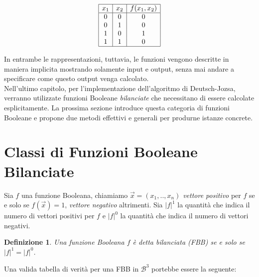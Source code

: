 \documentclass[12pt,a4paper,openright]{report}
\newtheorem{mydef}{Definizione}[chapter]
\begin{document}
\begin{displaymath}
    \begin{array}{|c|c|c|}\hline
        x_1 & x_2 & f(x_1, x_2) \\\hline 
        0   & 0   &  0  \\ 
        0   & 1   &  0  \\
        1   & 0   &  1  \\
        1   & 1   &  0  \\\hline
    \end{array}
\end{displaymath}

In entrambe le rappresentazioni, tuttavia, le funzioni vengono descritte in maniera implicita mostrando solamente input e output,
senza mai andare a specificare come questo output venga calcolato.\\
Nell'ultimo capitolo, per l'implementazione dell'algoritmo di Deutsch-Jozsa, verranno utilizzate funzioni Booleane \textit{bilanciate}
che necessitano di essere calcolate esplicitamente. La prossima sezione introduce questa categoria di funzioni Booleane e 
propone due metodi effettivi e generali per produrne istanze concrete.

\section{Classi di Funzioni Booleane Bilanciate}

Sia $f$ una funzione Booleana, chiamiamo $\vec{x}=(x_1,..,x_n)$ \textit{vettore positivo} per $f$ se e solo se
$f(\vec{x}) = 1$, \textit{vettore negativo} altrimenti. Sia ${\left\vert{f}\right\vert}^1$ la quantità che indica il numero di vettori
positivi per $f$ e ${\left\vert{f}\right\vert}^0$ la quantità che indica il numero di vettori negativi.
\begin{mydef}
    Una funzione Booleana $f$ è detta bilanciata (FBB) se e solo se ${\left\vert{f}\right\vert}^1 = {\left\vert{f}\right\vert}^0$.
\end{mydef}

\noindent Una valida tabella di verità per una FBB in $\mathcal{B}^3$ portebbe essere la seguente:
\end{document}
